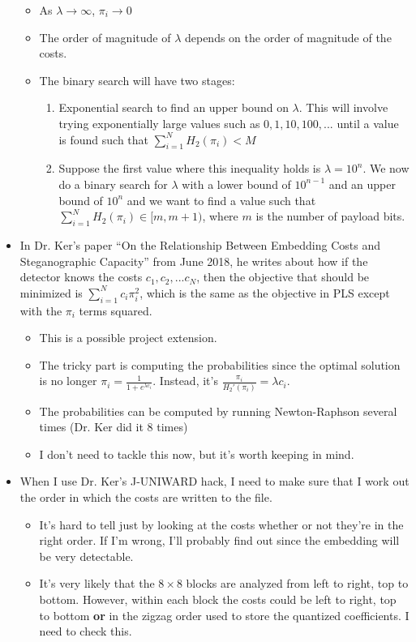 \documentclass[11pt,a4paper]{report}
\begin{document}
\begin{itemize}
\begin{itemize}
  \item As $\lambda \rightarrow \infty$, $\pi_i \rightarrow 0$

  \item The order of magnitude of $\lambda$ depends on the order of magnitude of the costs.

  \item The binary search will have two stages:
    \begin{enumerate}
    \item Exponential search to find an upper bound on $\lambda$. This will involve trying exponentially large values such as $0, 1, 10, 100, ...$ until a value is found such that $\sum\limits_{i=1}^N H_2(\pi_i) < M$
    \item Suppose the first value where this inequality holds is $\lambda = 10^n$. We now do a binary search for $\lambda$ with a lower bound of $10^{n-1}$ and an upper bound of $10^n$ and we want to find a value such that $\sum\limits_{i=1}^N H_2(\pi_i) \in [m, m+1)$, where $m$ is the number of payload bits.
    \end{enumerate}
  \end{itemize}
  
\item In Dr. Ker's paper ``On the Relationship Between Embedding Costs and Steganographic Capacity'' from June 2018, he writes about how if the detector knows the costs $c_1, c_2, ... c_N$, then the objective that should be minimized is $\sum\limits_{i=1}^N c_i \pi_i^2$, which is the same as the objective in PLS except with the $\pi_i$ terms squared.
  \begin{itemize}
  \item This is a possible project extension.

  \item The tricky part is computing the probabilities since the optimal solution is no longer $\pi_i = \frac{1}{1+e^{\lambda c_i}}$. Instead, it's $\frac{\pi_i}{H_{2}'(\pi_i)} = \lambda c_i$.

  \item The probabilities can be computed by running Newton-Raphson several times (Dr. Ker did it 8 times)

  \item I don't need to tackle this now, but it's worth keeping in mind.
  \end{itemize}

\item When I use Dr. Ker's J-UNIWARD hack, I need to make sure that I work out the order in which the costs are written to the file.
  \begin{itemize}
  \item It's hard to tell just by looking at the costs whether or not they're in the right order. If I'm wrong, I'll probably find out since the embedding will be very detectable.
  \item It's very likely that the $8\times8$ blocks are analyzed from left to right, top to bottom. However, within each block the costs could be left to right, top to bottom \textbf{or} in the zigzag order used to store the quantized coefficients. I need to check this.
  \end{itemize}


\end{itemize}
\end{document}
